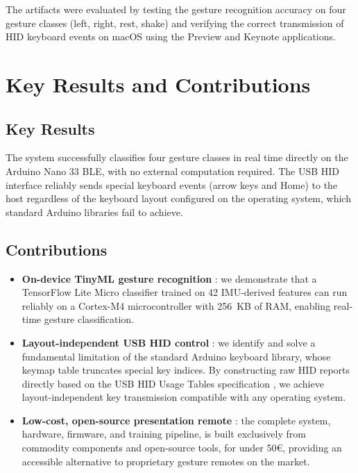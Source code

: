 \documentclass[sigconf,10pt,nonacm]{acmart}
\begin{document}
The artifacts were evaluated by testing the gesture recognition accuracy on four gesture classes (left, right, rest, shake) and verifying the correct 
transmission of HID keyboard events on macOS using the Preview and Keynote 
applications.

\section{Key Results and Contributions}
\label{sec:key-contributions}

\subsection*{Key Results}
The system successfully classifies four gesture classes in real time directly 
on the Arduino Nano 33 BLE, with no external computation required. The USB HID 
interface reliably sends special keyboard events (arrow keys and Home) to 
the host regardless of the keyboard layout configured on the operating system, 
which standard Arduino libraries fail to achieve.

\subsection*{Contributions}

\begin{itemize}
    \item \textbf{On-device TinyML gesture recognition} : we demonstrate that 
    a TensorFlow Lite Micro classifier trained on 42 IMU-derived features can 
    run reliably on a Cortex-M4 microcontroller with 256~KB of RAM, enabling 
    real-time gesture classification. 

    \item \textbf{Layout-independent USB HID control} : we identify and solve 
    a fundamental limitation of the standard Arduino keyboard library, whose 
    keymap table truncates special key indices. By constructing raw HID reports 
    directly based on the USB HID Usage Tables specification 
    \cite{HUT}, we achieve layout-independent key transmission 
    compatible with any operating system.

    \item \textbf{Low-cost, open-source presentation remote} : the complete 
    system, hardware, firmware, and training pipeline,  is built exclusively 
    from commodity components and open-source tools, for under 50€, providing 
    an accessible alternative to proprietary gesture remotes on the market.
\end{itemize}
\end{document}
